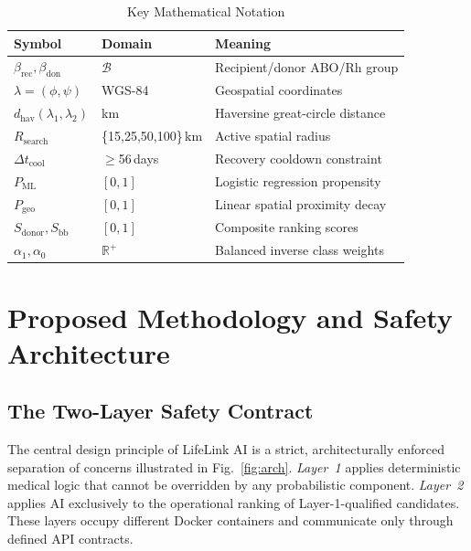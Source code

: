 \documentclass[conference]{IEEEtran}
\begin{document}
\begin{table}[t]
  \centering
  \caption{Key Mathematical Notation}
  \label{tab:notation}
  \setlength{\tabcolsep}{3pt}
  \renewcommand{\arraystretch}{1.05}
  \begin{tabular}{@{}lll@{}}
    \toprule
    \textbf{Symbol} & \textbf{Domain} & \textbf{Meaning} \\
    \midrule
    $\beta_\mathrm{rec},\beta_\mathrm{don}$ & $\mathcal{B}$ & Recipient/donor ABO/Rh group \\
    $\lambda=(\phi,\psi)$ & WGS-84 & Geospatial coordinates \\
    $d_\mathrm{hav}(\lambda_1,\lambda_2)$ & km & Haversine great-circle distance \\
    $R_\mathrm{search}$ & \{15,25,50,100\}\,km & Active spatial radius \\
    $\Delta t_\mathrm{cool}$ & $\geq$56\,days & Recovery cooldown constraint \\
    $P_\mathrm{ML}$ & $[0,1]$ & Logistic regression propensity \\
    $P_\mathrm{geo}$ & $[0,1]$ & Linear spatial proximity decay \\
    $S_\mathrm{donor},S_\mathrm{bb}$ & $[0,1]$ & Composite ranking scores \\
    $\alpha_1,\alpha_0$ & $\mathbb{R}^+$ & Balanced inverse class weights \\
    \bottomrule
  \end{tabular}
\end{table}

\section{Proposed Methodology and Safety Architecture}

\subsection{The Two-Layer Safety Contract}

The central design principle of LifeLink AI is a strict, architecturally
enforced separation of concerns illustrated in Fig.~\ref{fig:arch}.
\emph{Layer~1} applies deterministic medical logic that cannot be
overridden by any probabilistic component. \emph{Layer~2} applies AI
exclusively to the operational ranking of Layer-1-qualified candidates.
These layers occupy different Docker containers and communicate only
through defined API contracts.
\end{document}
